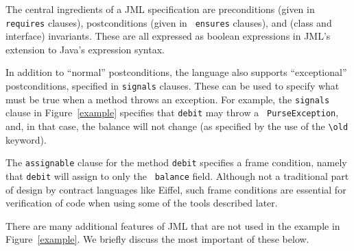 The central ingredients of a JML specification are preconditions
(given in {\tt requires} clauses), postconditions (given in {\tt
  ensures} clauses), and (class and interface) invariants.  These are
all expressed as boolean expressions in JML's extension to Java's
expression syntax.

In addition to ``normal'' postconditions, the language also supports
``exceptional'' postconditions, specified in {\tt signals} clauses.
These can be used to specify what must be true when a method throws an
exception.  For example, the {\tt signals} clause in
Figure~\ref{example} specifies that {\tt debit} may throw a {\tt
  PurseException}, and, in that case, the balance will not change (as
specified by the use of the \verb+\old+ keyword).

The {\tt assignable} clause for the method {\tt debit} specifies a
frame condition, namely that {\tt debit} will assign to only the {\tt
  balance} field.  Although not a traditional part of design by
contract languages like Eiffel, such frame conditions are essential for
verification of code when using some of the tools described later.

\medskip

There are many additional features of JML that are not used in the
example in Figure~\ref{example}. We briefly discuss the most important
of these below.

